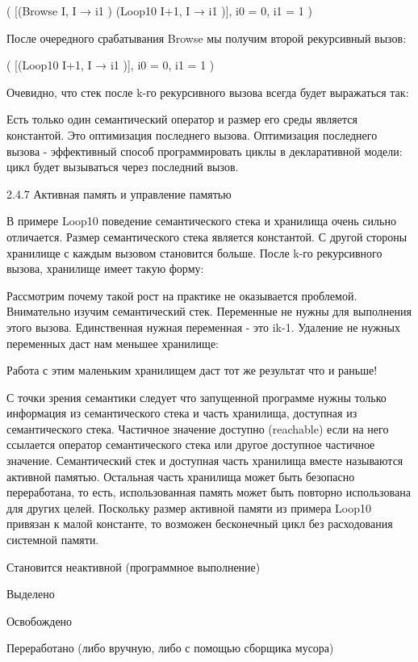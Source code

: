 ( [({Browse I}, {I → i1 }) ({Loop10 I+1}, {I → i1 })],
{i0 = 0, i1 = 1}  )

После очередного срабатывания Browse мы получим второй рекурсивный вызов:

( [({Loop10 I+1}, {I → i1 })],
{i0 = 0, i1 = 1}  )

Очевидно, что стек после k-го рекурсивного вызова всегда будет выражаться так:



Есть только один семантический оператор и размер его среды является константой. Это оптимизация последнего вызова. Оптимизация последнего вызова - эффективный способ программировать циклы в декларативной модели: цикл будет вызываться через последний вызов.

2.4.7 Активная память и управление памятью

В примере Loop10 поведение семантического стека и хранилища очень сильно отличается. Размер семантического стека является константой. С другой стороны хранилище с каждым вызовом становится больше. После k-го рекурсивного вызова, хранилище имеет такую форму:



Рассмотрим почему такой рост на практике не оказывается проблемой. Внимательно изучим семантический стек. Переменные  не нужны для выполнения этого вызова. Единственная нужная переменная - это ik-1. Удаление не нужных переменных даст нам меньшее хранилище:



Работа с этим маленьким хранилищем даст тот же результат что и раньше!

С точки зрения семантики следует что запущенной программе нужны только информация из семантического стека и часть хранилища, доступная из семантического стека. Частичное значение доступно (reachable) если на него ссылается оператор семантического стека или другое доступное частичное значение. Семантический стек и доступная часть хранилища вместе называются активной памятью. Остальная часть хранилища может быть безопасно переработана, то есть, использованная память может быть повторно использована для других целей. Поскольку размер активной памяти из примера Loop10 привязан к малой константе, то возможен бесконечный цикл без расходования системной памяти.

Становится неактивной (программное выполнение)

Выделено

Освобождено

Переработано (либо вручную, либо с помощью сборщика мусора)

